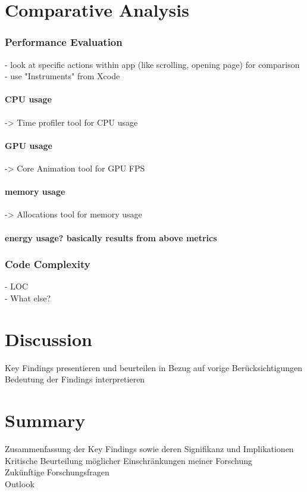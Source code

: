 \chapter{Comparative Analysis}
\subsection{Performance Evaluation}
- look at specific actions within app (like scrolling, opening page) for comparison\\
- use "Instruments" from Xcode\\
\subsubsection{CPU usage}
-> Time profiler tool for CPU usage\\
\subsubsection{GPU usage}
-> Core Animation tool for GPU FPS\\
\subsubsection{memory usage}
-> Allocations tool for memory usage\\
\subsubsection{energy usage? basically results from above metrics}
\subsection{Code Complexity}
- LOC\\
- What else?\\





\chapter{Discussion}
Key Findings presentieren und beurteilen in Bezug auf vorige Berücksichtigungen\\
Bedeutung der Findings interpretieren



\chapter{Summary}
Zusammenfassung der Key Findings sowie deren Signifikanz und Implikationen\\
Kritische Beurteilung möglicher Einschränkungen meiner Forschung\\
Zukünftige Forschungsfragen\\
Outlook\\


